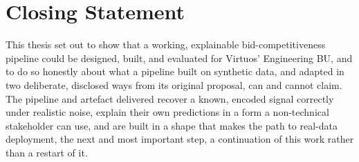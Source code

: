 \hypertarget{closing-statement}{%
\section{Closing Statement}\label{closing-statement}}

This thesis set out to show that a working, explainable
bid-competitiveness pipeline could be designed, built, and evaluated for
Virtuos' Engineering BU, and to do so honestly about what a pipeline
built on synthetic data, and adapted in two deliberate, disclosed ways
from its original proposal, can and cannot claim. The pipeline and
artefact delivered recover a known, encoded signal correctly under
realistic noise, explain their own predictions in a form a non-technical
stakeholder can use, and are built in a shape that makes the path to
real-data deployment, the next and most important step, a continuation
of this work rather than a restart of it.
